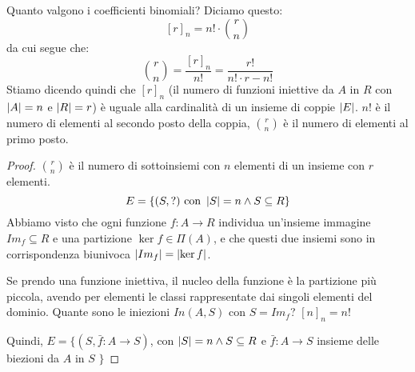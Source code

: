 
\begin{prop}
Quanto valgono i coefficienti binomiali? Diciamo questo:
\[
[r]_n = n! \cdot \binom{r}{n}
\]
da cui segue che:
\[
\binom{r}{n} = \frac{[r]_n}{n!} = \frac{r!}{n! \cdot {r-n}!}
\]
Stiamo dicendo quindi che $[r]_n$ (il numero di funzioni iniettive da $A$ in $R$ con $\left\lvert{A}\right\rvert = n$ e $\left\lvert{R}\right\rvert = r$) \`e uguale alla cardinalit\`a di un insieme di coppie $\left\lvert{E}\right\rvert$. $n!$ \`e il numero di elementi al secondo posto della coppia, $\binom{r}{n}$ \`e il numero di elementi al primo posto.
\end{prop}
\begin{proof}
$\binom{r}{n}$ \`e il numero di sottoinsiemi con $n$ elementi di un insieme con $r$ elementi.
\[
E = \{ (S, ?) \text{ con } \left\lvert{S}\right\rvert = n \land S \subseteq R \}
\]
Abbiamo visto che ogni funzione $f : A \to R$ individua un'insieme immagine $Im_f \subseteq R$ e una partizione $\ker f \in \Pi(A)$, e che questi due insiemi sono in corrispondenza biunivoca $\left\lvert{Im_f}\right\rvert = \left\lvert{\ker f}\right\rvert$.

Se prendo una funzione iniettiva, il nucleo della funzione \`e la partizione pi\`u piccola, avendo per elementi le classi rappresentate dai singoli elementi del dominio. Quante sono le iniezioni $In(A, S)$ con $S = Im_f$? $[n]_n = n!$

Quindi, $ E = \{ (S, \bar f : A \to S) $, con $ \left\lvert{S}\right\rvert = n \land S \subseteq R $ e $\bar f : A \to S$ insieme delle biezioni da $A$ in $S$ $\}$
\end{proof}

